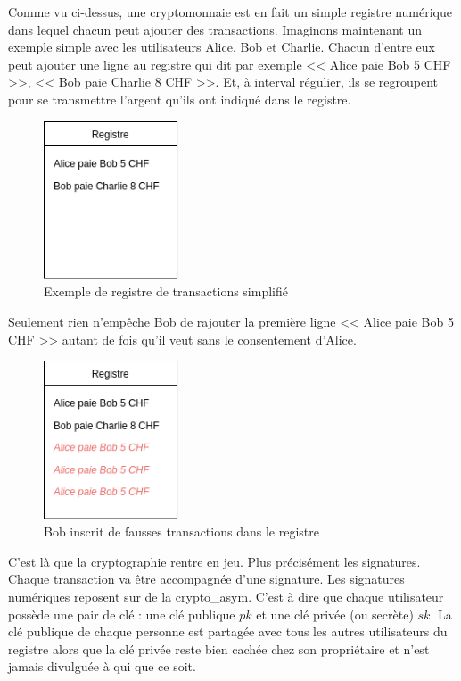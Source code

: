Comme vu ci-dessus, une cryptomonnaie est en fait un simple registre numérique dans lequel chacun peut ajouter des transactions. Imaginons maintenant un exemple simple avec les utilisateurs Alice, Bob et Charlie. Chacun d'entre eux peut ajouter une ligne au registre qui dit par exemple << Alice paie Bob 5 CHF >>, << Bob paie Charlie 8 CHF >>. Et, à interval régulier, ils se regroupent pour se transmettre l'argent qu'ils ont indiqué dans le registre.

\begin{figure}[H]
  \centering
  \includegraphics[width=4cm]{images/crypto_1.png}
  \caption{Exemple de registre de transactions simplifié}
\end{figure}

Seulement rien n'empêche Bob de rajouter la première ligne << Alice paie Bob 5 CHF >> autant de fois qu'il veut sans le consentement d'Alice.

\begin{figure}[H]
  \centering
  \includegraphics[width=4cm]{images/crypto_2.png}
  \caption{Bob inscrit de fausses transactions dans le registre}
\end{figure}

C'est là que la cryptographie rentre en jeu. Plus précisément les \glspl{signature}. Chaque transaction va être accompagnée d'une signature. Les signatures numériques reposent sur de la \gls{crypto_asym}. C'est à dire que chaque utilisateur possède une pair de clé : une clé publique $pk$ et une clé privée (ou secrète) $sk$. La clé publique de chaque personne est partagée avec tous les autres utilisateurs du registre alors que la clé privée reste bien cachée chez son propriétaire et n'est jamais divulguée à qui que ce soit.

